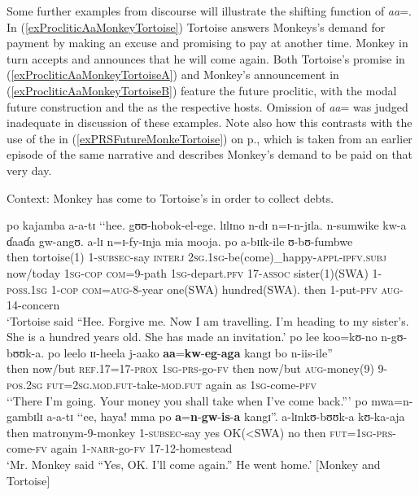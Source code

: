 Some further examples from discourse will illustrate the shifting function of \textit{aa}=. In (\ref{exProcliticAaMonkeyTortoise}) Tortoise answers Monkeys's demand for payment by making an excuse and promising to pay at another time. Monkey in turn accepts and announces that he will come again. Both Tortoise's promise in (\ref{exProcliticAaMonkeyTortoiseA}) and Monkey's announcement in (\ref{exProcliticAaMonkeyTortoiseB}) feature the future proclitic, with the modal future construction and the  as the respective hosts. Omission of \textit{aa}= was judged inadequate in discussion of these examples. Note also how this contrasts with the use of the  in (\ref{exPRSFutureMonkeTortoise}) on p.\nobreakspace\pageref{exPRSFutureMonkeTortoise}, which is taken from an earlier episode of the same narrative and describes Monkey's demand to be paid on that very day.
\begin{exe}
\ex Context: Monkey has come to Tortoise's in order to collect debts.
\label{exProcliticAaMonkeyTortoise}
\begin{xlist}
\ex \label{exProcliticAaMonkeyTortoiseA}
\gll po kajamba a-a-tɪ \textup{\lq\lq}hee. gʊʊ-hobok-el-ege. lɪlɪno n-dɪ n=ɪ-n-jɪla. n-sumwike kw-a ɗaaɗa gw-angʊ. a-lɪ n=ɪ-fy-ɪnja mia mooja. po a-bɪɪk-ile ʊ-bʊ-fumbwe\\
then tortoise(1) 1-\textsc{subsec}-say \phantom{\lq\lq}\textsc{interj} \textsc{2sg.1sg}-be(come)\_happy-\textsc{appl}-\textsc{ipfv.subj} now/today \textsc{1sg}-\textsc{cop} \textsc{com}=9-path \textsc{1sg}-depart.\textsc{pfv} 17-\textsc{assoc} sister(1)(SWA) 1-\textsc{poss.1sg} 1-\textsc{cop} \textsc{com}=\textsc{aug}-8-year one(SWA) hundred(SWA). then 1-put-\textsc{pfv} \textsc{aug}-14-concern\\
\glt `Tortoise said ``Hee. Forgive me. Now I am travelling. I'm heading to my sister's. She is a hundred years old. She has made an invitation.'
\ex \gll po lee koo=kʊ-no n-gʊ-bʊʊk-a. po leelo ɪɪ-heela j-aako \textbf{aa}=\textbf{kw}-\textbf{eg}-\textbf{aga} kangɪ bo n-iis-ile\textup{''}\\
then now/but \textsc{ref.17}=17-\textsc{prox} \textsc{1sg}-\textsc{prs}-go-\textsc{fv} then now/but \textsc{aug}-money(9) 9-\textsc{pos.2sg} \textsc{fut}=\textsc{2sg.mod.fut}-take-\textsc{mod.fut} again as \textsc{1sg}-come-\textsc{pfv}\\
\glt  \lq\lq There I'm going. Your money you shall take when I've come back.''{}'
\ex \label{exProcliticAaMonkeyTortoiseB}
\gll po mwa=n-gambɪlɪ a-a-tɪ \textup{\lq\lq}ee, haya! mma po \textbf{a}=\textbf{n}-\textbf{gw}-\textbf{is}-\textbf{a} kangɪ\textup{''}. a-lɪnkʊ-bʊʊk-a kʊ-ka-aja\\
then matronym-9-monkey 1-\textsc{subsec}-say yes OK(<SWA) no then \textsc{fut}=\textsc{1sg}-\textsc{prs}-come-\textsc{fv} again 1-\textsc{narr}-go-\textsc{fv} 17-12-homestead\\
\glt `Mr. Monkey said ``Yes, OK. I'll come again.'' He went home.' [Monkey and Tortoise]
\end{xlist}
\end{exe}

